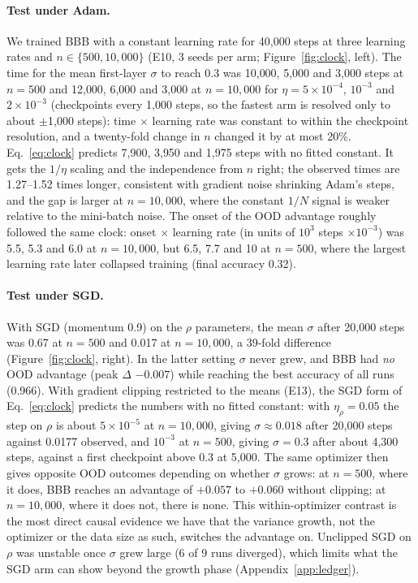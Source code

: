 \documentclass[10pt]{article}
\begin{document}
\paragraph{Test under Adam.} We trained BBB with a constant learning rate for
40{,}000 steps at three learning rates and $n\in\{500,10{,}000\}$ (E10, 3 seeds per
arm; Figure~\ref{fig:clock}, left). The time for the mean first-layer $\sigma$ to
reach 0.3 was 10{,}000, 5{,}000 and 3{,}000 steps at $n=500$ and 12{,}000,
6{,}000 and 3{,}000 at $n=10{,}000$ for $\eta=5\times10^{-4}$, $10^{-3}$ and
$2\times10^{-3}$ (checkpoints every 1{,}000 steps, so the fastest arm is resolved
only to about $\pm$1{,}000 steps): time $\times$ learning rate was constant to
within the checkpoint resolution, and a twenty-fold change in $n$ changed it by
at most 20\%. Eq.~\ref{eq:clock}
predicts 7{,}900, 3{,}950 and 1{,}975 steps with no fitted constant. It gets the
$1/\eta$ scaling and the independence from $n$ right; the observed times are
1.27--1.52 times longer, consistent with gradient noise shrinking Adam's
steps, and the gap is larger at $n=10{,}000$, where the constant $1/N$ signal
is weaker relative to the mini-batch noise. The onset of the OOD advantage
roughly followed the same clock: onset $\times$ learning rate (in units of
$10^3$ steps $\times 10^{-3}$) was 5.5, 5.3 and 6.0 at $n=10{,}000$, but 6.5, 7.7 and
10 at $n=500$, where the largest learning rate later collapsed training (final
accuracy 0.32).

\paragraph{Test under SGD.} With SGD (momentum 0.9) on the $\rho$ parameters,
the mean $\sigma$ after 20{,}000 steps was 0.67 at $n=500$ and 0.017 at
$n=10{,}000$, a 39-fold difference (Figure~\ref{fig:clock}, right). In the
latter setting $\sigma$ never grew, and BBB had \emph{no} OOD advantage (peak
$\Delta$ $-0.007$) while reaching the best accuracy of all runs (0.966). With
gradient clipping restricted to the means (E13), the SGD form of
Eq.~\ref{eq:clock} predicts the numbers with no fitted constant: with
$\eta_\rho=0.05$ the step on $\rho$ is about $5\times10^{-5}$ at $n=10{,}000$,
giving $\sigma\approx0.018$ after 20{,}000 steps against 0.0177 observed, and
$10^{-3}$ at $n=500$, giving $\sigma=0.3$ after about 4{,}300 steps, against a
first checkpoint above 0.3 at 5{,}000. The same optimizer then gives opposite
OOD outcomes depending on whether $\sigma$ grows: at $n=500$, where it does, BBB
reaches an advantage of $+0.057$ to $+0.060$ without clipping; at $n=10{,}000$,
where it does not, there is none. This within-optimizer contrast is the most
direct causal evidence we have that the variance growth, not the optimizer
or the data size as such, switches the advantage on. Unclipped SGD on $\rho$
was unstable once $\sigma$ grew large (6 of 9 runs diverged), which limits what
the SGD arm can show beyond the growth phase (Appendix~\ref{app:ledger}).
\end{document}
